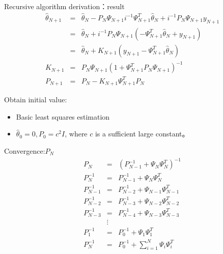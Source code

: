 \begin{frame}{Recursive algorithm derivation：result}
\begin{eqnarray*}
\hat\theta_{N+1} &=& \hat\theta_N-P_N\Psi_{N+1}i^{-1}\Psi_{N+1}^T \hat\theta_N +i^{-1}P_N\Psi_{N+1}y_{N+1} \\
&=& \hat\theta_N+i^{-1}P_N\Psi_{N+1}(-\Psi_{N+1}^T \hat\theta_N +y_{N+1}) \\
&=& \hat\theta_N+ K_{N+1}(y_{N+1}-\Psi_{N+1}^T\hat\theta_N) \\
K_{N+1} &=& P_N\Psi_{N+1}(1+\Psi_{N+1}^T P_N \Psi_{N+1})^{-1} \\
P_{N+1} &=& P_N -K_{N+1}\Psi_{N+1}^T P_N 
\end{eqnarray*}

Obtain initial value:
\begin{itemize}
\item  Basic least squares estimation 
\item $\hat\theta_0=0,P_0=c^2I$, where $c$ is a sufficient large constant。
\end{itemize}
\end{frame}

\begin{frame}{Convergence:$P_N$}
\begin{eqnarray*}
P_N &=& (P_{N-1}^{-1}+\Psi_N\Psi_N^T)^{-1} \\
P_N^{-1} &=& P_{N-1}^{-1}+\Psi_N\Psi_N^T  \\
P_{N-1}^{-1} &=& P_{N-2}^{-1}+\Psi_{N-1}\Psi_{N-1}^T  \\
P_{N-2}^{-1} &=& P_{N-3}^{-1}+\Psi_{N-2}\Psi_{N-2}^T  \\
P_{N-3}^{-1} &=& P_{N-4}^{-1}+\Psi_{N-3}\Psi_{N-3}^T  \\
& \vdots & \\
P_1^{-1} &=& P_0^{-1}+\Psi_1\Psi_1^T  \\
P_N^{-1} &=& P_0^{-1}+\sum_{i=1}^{N}\Psi_i\Psi_i^T \\
\end{eqnarray*}
\end{frame}

